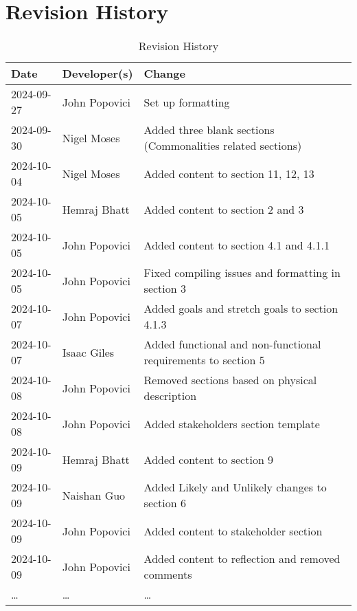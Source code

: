 \section*{Revision History}

\begin{table}[hp]
\caption{Revision History} \label{TblRevisionHistory}
\begin{tabularx}{\textwidth}{llX}
\toprule
\textbf{Date} & \textbf{Developer(s)} & \textbf{Change}\\
\midrule
2024-09-27 & John Popovici & Set up formatting\\
2024-09-30 & Nigel Moses & Added three blank sections (Commonalities related sections)\\
2024-10-04 & Nigel Moses & Added content to section 11, 12, 13\\
2024-10-05 & Hemraj Bhatt & Added content to section 2 and 3\\
2024-10-05 & John Popovici & Added content to section 4.1 and 4.1.1\\
2024-10-05 & John Popovici & Fixed compiling issues and formatting in section 3\\
2024-10-07 & John Popovici & Added goals and stretch goals to section 4.1.3\\
2024-10-07 & Isaac Giles & Added functional and non-functional requirements to section 5\\
2024-10-08 & John Popovici & Removed sections based on physical description\\
2024-10-08 & John Popovici & Added stakeholders section template\\
2024-10-09 & Hemraj Bhatt & Added content to section 9\\
2024-10-09 & Naishan Guo & Added Likely and Unlikely changes to section 6\\
2024-10-09 & John Popovici & Added content to stakeholder section\\
2024-10-09 & John Popovici & Added content to reflection and removed comments\\
\dots & \dots & \dots\\
\bottomrule
\end{tabularx}
\end{table}

